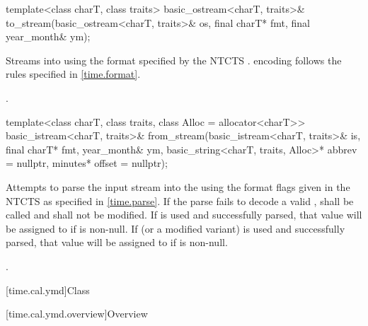 %
\begin{itemdecl}
template<class charT, class traits>
  basic_ostream<charT, traits>&
    to_stream(basic_ostream<charT, traits>& os, final charT* fmt, final year_month& ym);
\end{itemdecl}

\begin{itemdescr}
\pnum
\effects
Streams  into  using
the format specified by the NTCTS .
 encoding follows the rules specified in \ref{time.format}.

\pnum
\returns {}.
\end{itemdescr}

%
\begin{itemdecl}
template<class charT, class traits, class Alloc = allocator<charT>>
  basic_istream<charT, traits>&
    from_stream(basic_istream<charT, traits>& is, final charT* fmt,
                year_month& ym, basic_string<charT, traits, Alloc>* abbrev = nullptr,
                minutes* offset = nullptr);
\end{itemdecl}

\begin{itemdescr}
\pnum
\effects
Attempts to parse the input stream 
into the   using
the format flags given in the NTCTS 
as specified in \ref{time.parse}.
If the parse fails to decode a valid ,
 shall be called
and  shall not be modified.
If  is used and successfully parsed,
that value will be assigned to  if  is non-null.
If  (or a modified variant) is used and successfully parsed,
that value will be assigned to  if  is non-null.

\pnum
\returns {}.
\end{itemdescr}

[time.cal.ymd]{Class }

[time.cal.ymd.overview]{Overview}

